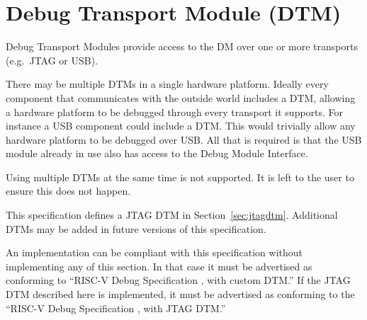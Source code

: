 \chapter{Debug Transport Module (DTM)} \label{dtm}

Debug Transport Modules provide access to the DM over one or more transports
(e.g.\ JTAG or USB).

There may be multiple DTMs in a single hardware platform. Ideally every component that
communicates with the outside world includes a DTM, allowing a hardware platform to be
debugged through every transport it supports.  For instance a USB component
could include a DTM. This would trivially allow any hardware platform to be debugged
over USB. All that is required is that the USB module already in use also has
access to the Debug Module Interface.

Using multiple DTMs at the same time is not supported. It is left to the user
to ensure this does not happen.

This specification defines a JTAG DTM in Section~\ref{sec:jtagdtm}. Additional DTMs
may be added in future versions of this specification.

An implementation can be compliant with this specification without implementing
any of this section. In that case it must be advertised as conforming to
``RISC-V Debug Specification \versionnum, with custom DTM.'' If the JTAG DTM
described here is implemented, it must be advertised as conforming to the
``RISC-V Debug Specification \versionnum, with JTAG DTM.''


